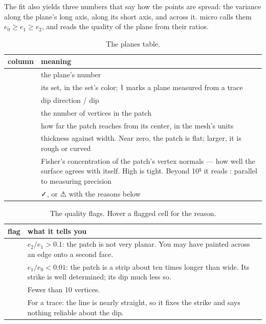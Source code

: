 The fit also yields three numbers that say how the points are spread: the variance along the plane's long axis, along its short axis, and across it. micro calls them $e_0 \ge e_1 \ge e_2$, and reads the quality of the plane from their ratios.

\begin{table}[htbp]\small
\begin{tabularx}{\linewidth}{@{}lL@{}}\toprule
column & meaning \\ \midrule
\ui{\#} & the plane's number \\
 & its set, in the set's color; ⌇ marks a plane measured from a trace \\
 & dip direction / dip \\
 & the number of vertices in the patch \\
 & how far the patch reaches from its center, in the mesh's units \\
 & thickness against width. Near zero, the patch is flat; larger, it is rough or curved \\
 & Fisher's concentration \parencite{fisher1953} of the patch's vertex normals — how well the surface agrees with itself. High is tight. Beyond 10⁵ it reads : parallel to measuring precision \\
 & ✓, or ⚠ with the reasons below \\ \bottomrule
\end{tabularx}
\caption{The planes table.}\label{tab:structure-planes}
\end{table}

\begin{table}[htbp]\small
\begin{tabularx}{\linewidth}{@{}lL@{}}\toprule
flag & what it tells you \\ \midrule
{} & $e_2/e_1 > 0.1$: the patch is not very planar. You may have painted across an edge onto a second face. \\
 & $e_1/e_0 < 0.01$: the patch is a strip about ten times longer than wide. Its strike is well determined; its dip much less so. \\
 & Fewer than 10 vertices. \\
 & For a trace: the line is nearly straight, so it fixes the strike and says nothing reliable about the dip. \\ \bottomrule
\end{tabularx}
\caption{The quality flags. Hover a flagged cell for the reason.}\label{tab:structure-flags}
\end{table}

